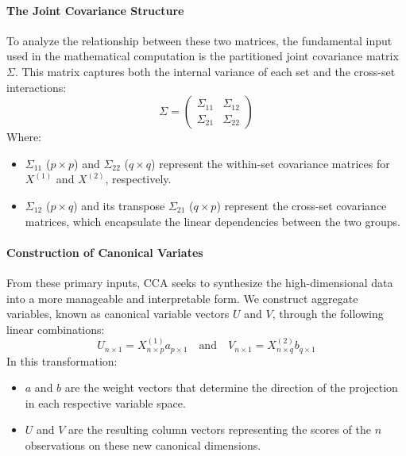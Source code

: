 \paragraph{The Joint Covariance Structure}


To analyze the relationship between these two matrices, the fundamental input used in the mathematical computation is the partitioned joint covariance matrix $\Sigma$. This matrix captures both the internal variance of each set and the cross-set interactions:
\begin{equation}
\Sigma = \begin{pmatrix} 
\Sigma_{11} & \Sigma_{12} \\ 
\Sigma_{21} & \Sigma_{22} 
\end{pmatrix}
\end{equation}
Where:
\begin{itemize}
    \item $\Sigma_{11}$ ($p \times p$) and $\Sigma_{22}$ ($q \times q$) represent the within-set covariance matrices for $X^{(1)}$ and $X^{(2)}$, respectively.
    \item $\Sigma_{12}$ ($p \times q$) and its transpose $\Sigma_{21}$ ($q \times p$) represent the cross-set covariance matrices, which encapsulate the linear dependencies between the two groups.
\end{itemize}

\paragraph{Construction of Canonical Variates}
From these primary inputs, CCA seeks to synthesize the high-dimensional data into a more manageable and interpretable form. We construct aggregate variables, known as canonical variable vectors $U$ and $V$, through the following linear combinations:
\begin{equation}
U_{n\times 1} = X_{n\times p}^{(1)} a_{p\times 1} \quad \text{and} \quad V_{n\times 1} = X_{n\times q}^{(2)} b_{q\times 1}
\end{equation}
In this transformation:
\begin{itemize}
    \item $a$ and $b$ are the weight vectors that determine the direction of the projection in each respective variable space.
    \item $U$ and $V$ are the resulting column vectors representing the scores of the $n$ observations on these new canonical dimensions.
\end{itemize}

